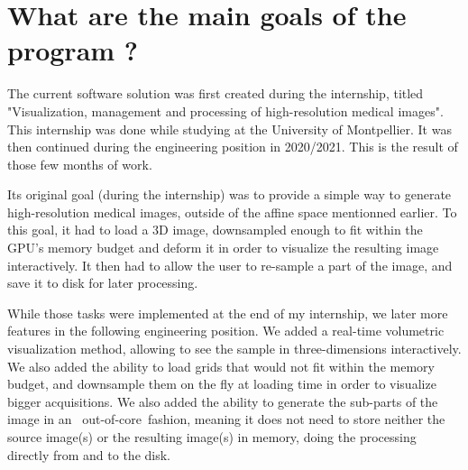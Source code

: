 \section{What are the main goals of the program ?}\label{text:01_intro:01_goals}
{

	The current software solution was first created during the internship, titled "Visualization, management and processing of high-resolution medical images". This internship was done while studying at the University of Montpellier. It was then continued during the engineering position in 2020/2021. This is the result of those few months of work.

	Its original goal (during the internship) was to provide a simple way to generate high-resolution medical images, outside of the affine space mentionned earlier. To this goal, it had to load a 3D image, downsampled enough to fit within the GPU's memory budget and deform it in order to visualize the resulting image interactively. It then had to allow the user to re-sample a part of the image, and save it to disk for later processing.


	While those tasks were implemented at the end of my internship, we later more features in the following engineering position. We added a real-time volumetric visualization method, allowing to see the sample in three-dimensions interactively. We also added the ability to load grids that would not fit within the memory budget, and downsample them on the fly at loading time in order to visualize bigger acquisitions. We also added the ability to generate the sub-parts of the image in an \guillemotleft~out-of-core~\guillemotright fashion, meaning it does not need to store neither the source image(s) or the resulting image(s) in memory, doing the processing directly from and to the disk.
}

